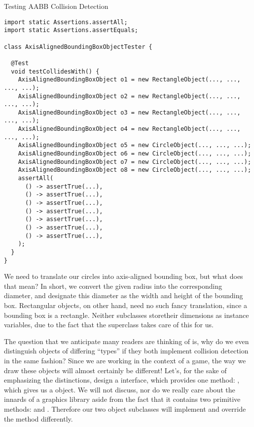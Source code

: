\begin{cl}{Testing AABB Collision Detection}
\begin{lstlisting}[language=MyJava]
import static Assertions.assertAll;
import static Assertions.assertEquals;

class AxisAlignedBoundingBoxObjectTester {

  @Test
  void testCollidesWith() {
    AxisAlignedBoundingBoxObject o1 = new RectangleObject(..., ..., ..., ...);
    AxisAlignedBoundingBoxObject o2 = new RectangleObject(..., ..., ..., ...);
    AxisAlignedBoundingBoxObject o3 = new RectangleObject(..., ..., ..., ...);
    AxisAlignedBoundingBoxObject o4 = new RectangleObject(..., ..., ..., ...);
    AxisAlignedBoundingBoxObject o5 = new CircleObject(..., ..., ...);
    AxisAlignedBoundingBoxObject o6 = new CircleObject(..., ..., ...);
    AxisAlignedBoundingBoxObject o7 = new CircleObject(..., ..., ...);
    AxisAlignedBoundingBoxObject o8 = new CircleObject(..., ..., ...);
    assertAll(
      () -> assertTrue(...),
      () -> assertTrue(...),
      () -> assertTrue(...),
      () -> assertTrue(...),
      () -> assertTrue(...),
      () -> assertTrue(...),
      () -> assertTrue(...),
    );
  }
}
\end{lstlisting}
\end{cl}

We need to translate our circles into axis-aligned bounding box, but what does that mean? In short, we convert the given radius into the corresponding diameter, and designate this diameter as the width and height of the bounding box. Rectangular objects, on other hand, need no such fancy translation, since a bounding box is a rectangle. Neither subclasses storetheir dimensions as instance variables, due to the fact that the superclass takes care of this for us.

The question that we anticipate many readers are thinking of is, why do we even distinguish objects of differing ``types'' if they both implement collision detection in the same fashion? Since we are working in the context of a game, the way we draw these objects will almost certainly be different! Let's, for the sake of emphasizing the distinctions, design a  interface, which provides one method: , which gives us a  object. We will not discuss, nor do we really care about the innards of a graphics library aside from the fact that it contains two primitive methods:  and . Therefore our two object subclasses will implement  and override the method differently.

